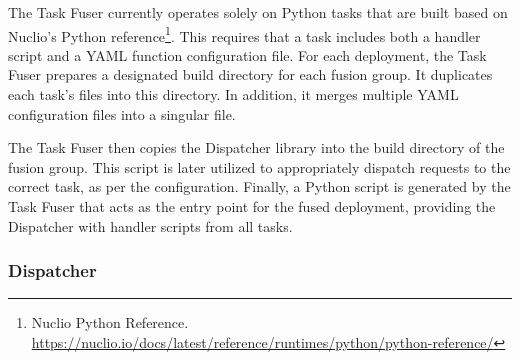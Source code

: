 The Task Fuser currently operates solely on Python tasks that are built based on
Nuclio's Python reference\footnote{Nuclio Python Reference.
\url{https://nuclio.io/docs/latest/reference/runtimes/python/python-reference/}}.
This requires that a task includes both a handler script and a YAML function
configuration file. For each deployment, the Task Fuser prepares a designated
build directory for each fusion group. It duplicates each task's files into this
directory. In addition, it merges multiple YAML configuration files into a
singular file.

The Task Fuser then copies the Dispatcher library into the build directory of
the fusion group. This script is later utilized to appropriately dispatch
requests to the correct task, as per the configuration. Finally, a Python script
is generated by the Task Fuser that acts as the entry point for the fused
deployment, providing the Dispatcher with handler scripts from all tasks.

\subsubsection{Dispatcher}


